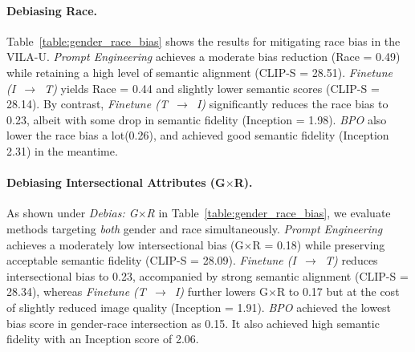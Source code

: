 \paragraph{Debiasing Race.}
Table~\ref{table:gender_race_bias} shows the results for mitigating race bias in the VILA-U. 
\emph{Prompt Engineering} achieves a moderate bias reduction (Race = 0.49) while retaining a high level of semantic alignment (CLIP-S = 28.51). 
\emph{Finetune (I~$\rightarrow$~T)} yields Race = 0.44 and slightly lower semantic scores (CLIP-S = 28.14). 
By contrast, \emph{Finetune (T~$\rightarrow$~I)} significantly reduces the race bias to 0.23, albeit with some drop in semantic fidelity (Inception = 1.98). \emph{BPO} also lower the race bias a lot(0.26), and achieved good semantic fidelity (Inception 2.31) in the meantime.
\vspace{-1em}
\paragraph{Debiasing Intersectional Attributes (G$\times$R).}
As shown under \emph{Debias: G$\times$R} in Table~\ref{table:gender_race_bias}, we evaluate methods targeting \emph{both} gender and race simultaneously. 
\emph{Prompt Engineering} achieves a moderately low intersectional bias (G$\times$R = 0.18) while preserving acceptable semantic fidelity (CLIP-S = 28.09). 
\emph{Finetune (I~$\rightarrow$~T)} reduces intersectional bias to 0.23, accompanied by strong semantic alignment (CLIP-S = 28.34), whereas 
\emph{Finetune (T~$\rightarrow$~I)} further lowers G$\times$R to 0.17 but at the cost of slightly reduced image quality (Inception = 1.91). \emph{BPO} achieved the lowest bias score in gender-race intersection as 0.15. It also achieved high semantic fidelity with an Inception score of 2.06.
